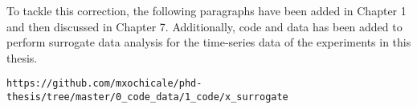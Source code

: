 \documentclass[12pt]{article}
\begin{document}









To tackle this correction, the following paragraphs have been added 
in Chapter 1 and then discussed in Chapter 7. Additionally,
code and data has been added to perform surrogate data analysis
for the time-series data of the experiments in this thesis.
	\begin{verbatim}
https://github.com/mxochicale/phd-thesis/tree/master/0_code_data/1_code/x_surrogate
	\end{verbatim}
\end{document}
